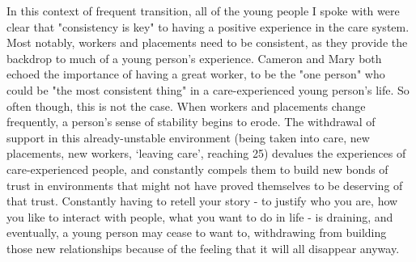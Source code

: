 In this context of frequent transition, all of the young people I spoke with were clear that "consistency is key" to having a positive experience in the care system. Most notably, workers and placements need to be consistent, as they provide the backdrop to much of a young person’s experience. Cameron and Mary both echoed the importance of having a great worker, to be the "one person" who could be "the most consistent thing" in a care-experienced young person's life. So often though, this is not the case. When workers and placements change frequently, a person’s sense of stability begins to erode. The withdrawal of support in this already-unstable environment (being taken into care, new placements, new workers, `leaving care', reaching 25) devalues the experiences of care-experienced people, and constantly compels them to build new bonds of trust in environments that might not have proved themselves to be deserving of that trust. Constantly having to retell your story - to justify who you are, how you like to interact with people, what you want to do in life - is draining, and eventually, a young person may cease to want to, withdrawing from building those new relationships because of the feeling that it will all disappear anyway.

